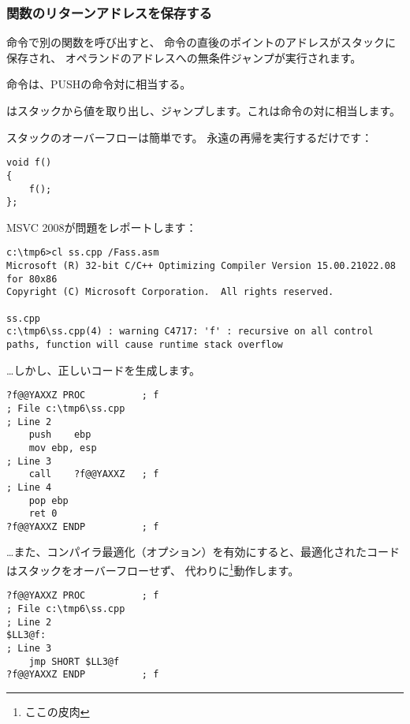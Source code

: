 \subsubsection{関数のリターンアドレスを保存する}


\CALL 命令で別の関数を呼び出すと、 \CALL 命令の直後のポイントのアドレスがスタックに保存され、 
\CALL オペランドのアドレスへの無条件ジャンプが実行されます。

\CALL 命令は、PUSHの命令対に相当する。

\RET はスタックから値を取り出し、ジャンプします。これは命令の対に相当します。

\myindex{\Stack!\MLStackOverflow}
\myindex{\Recursion}
スタックのオーバーフローは簡単です。 永遠の再帰を実行するだけです：


\begin{lstlisting}[style=customc]
void f()
{
	f();
};
\end{lstlisting}

MSVC 2008が問題をレポートします：

\begin{lstlisting}
c:\tmp6>cl ss.cpp /Fass.asm
Microsoft (R) 32-bit C/C++ Optimizing Compiler Version 15.00.21022.08 for 80x86
Copyright (C) Microsoft Corporation.  All rights reserved.

ss.cpp
c:\tmp6\ss.cpp(4) : warning C4717: 'f' : recursive on all control paths, function will cause runtime stack overflow
\end{lstlisting}

\dots しかし、正しいコードを生成します。

\begin{lstlisting}[style=customasmx86]
?f@@YAXXZ PROC			; f
; File c:\tmp6\ss.cpp
; Line 2
	push	ebp
	mov	ebp, esp
; Line 3
	call	?f@@YAXXZ	; f
; Line 4
	pop	ebp
	ret	0
?f@@YAXXZ ENDP			; f
\end{lstlisting}

\dots また、コンパイラ最適化（\TT{\Ox}オプション）を有効にすると、最適化されたコードはスタックをオーバーフローせず、
代わりに\footnote{ここの皮肉}動作します。

\begin{lstlisting}[style=customasmx86]
?f@@YAXXZ PROC			; f
; File c:\tmp6\ss.cpp
; Line 2
$LL3@f:
; Line 3
	jmp	SHORT $LL3@f
?f@@YAXXZ ENDP			; f
\end{lstlisting}

